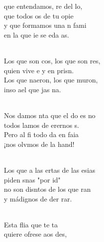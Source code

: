 \begin{cancion}%
	 que entendamos, re del lo,\\
	que todos os de tu opie\\
	y que formamos una n fami\\
	en la que ie se eda as. \\\jump\\
	\begin{chorus}%
	Los que son cos, los que son res,\\
	quien vive e y en prisn. \\
	Los que naeron, los que muron,\\
	inso ael que jas na.  \\
	\end{chorus}%
	\jump\\
	Nos damos nta que el do es no\\
	todos lamos de erernos s.\\
	Pero al fi todo da en faia\\
	¡nos olvmos de la hand!\\\jump\\
	\begin{chorus}%
	Los que a las ertas de las esias\\
	piden snas "por id"\\
	no son disntos de los que ran\\
	y  mádignos de der rar.\\
	\end{chorus}%
	\jump\\
	Esta flia que  te ta\\
	quiere ofrese aos des,\\

\end{cancion}
